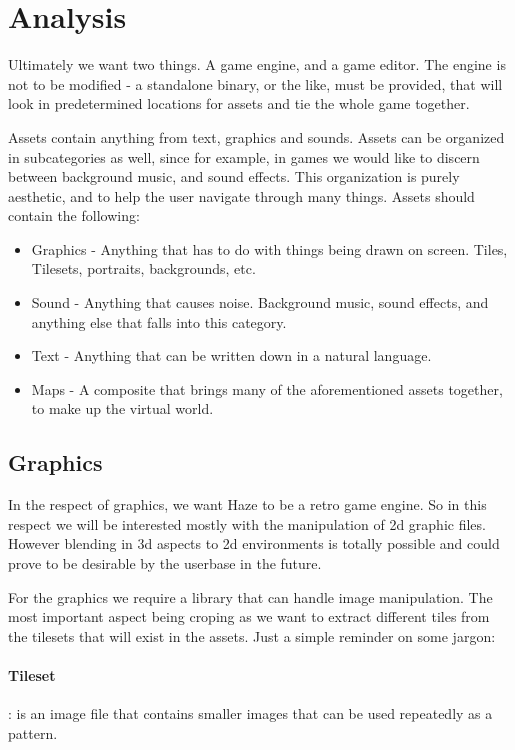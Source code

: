\section{Analysis}

Ultimately we want two things. A game engine, and a game editor. The engine is 
not to be modified - a standalone binary, or the like, must be provided, that 
will look in predetermined locations for assets and tie the whole game
together.

Assets contain anything from text, graphics and sounds. Assets can be organized
in subcategories as well, since for example, in games we would like to discern
between background music, and sound effects. This organization is purely
aesthetic, and to help the user navigate through many things. Assets should 
contain the following:

\begin{itemize}
\item Graphics - Anything that has to do with things being drawn on screen.
Tiles, Tilesets, portraits, backgrounds, etc.
\item Sound - Anything that causes noise. Background music, sound effects, and
anything else that falls into this category.
\item Text - Anything that can be written down in a natural language.
\item Maps - A composite that brings many of the aforementioned assets
together, to make up the virtual world.
\end{itemize}

\subsection{Graphics}

In the respect of graphics, we want Haze to be a retro game engine. So in this
respect we will be interested mostly with the manipulation of 2d graphic files.
However blending in 3d aspects to 2d environments is totally possible and could
prove to be desirable by the userbase in the future.

For the graphics we require a library that can handle image manipulation. The
most important aspect being croping as we want to extract different tiles from
the tilesets that will exist in the assets. Just a simple reminder on some
jargon:

\paragraph{Tileset}: is an image file that contains smaller images that can be
used repeatedly as a pattern. 

